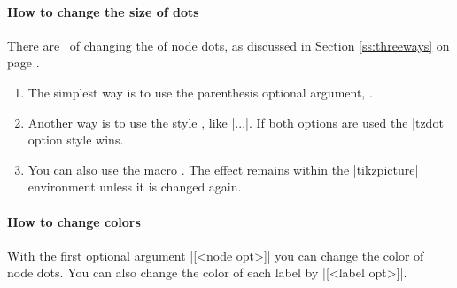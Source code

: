 \begin{tzcode}{.3}
\end{tzcode}



\paragraph{How to change the size of dots}

There are \threeways\ of changing the  of node dots, as discussed in Section \ref{ss:threeways} on page \pageref{ss:threeways}.

\begin{enumerate}
\item The simplest way is to use the  parenthesis optional argument, .
\item Another way is to use the style , like |\tzdots[tzdot=3pt]...|.
If both options are used the |tzdot| option style wins.
\item You can also use the macro \icmd{\settzdotsize}.
The effect remains within the |tikzpicture| environment unless it is changed again.
\end{enumerate}

\begin{tzcode}{.3}
\end{tzcode}



\paragraph{How to change colors}

With the first optional argument |[<node opt>]| you can change the color of node dots.
You can also change the color of each label by |[<label opt>]|.

\begin{tzcode}{.3}
\end{tzcode}

